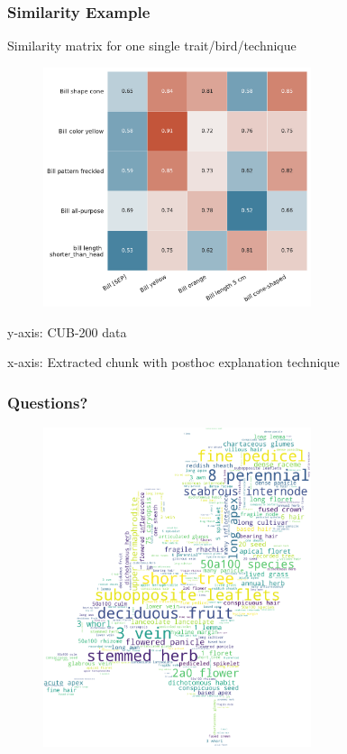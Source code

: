 \documentclass{beamer}
\begin{document}
\begin{frame}
\frametitle{Similarity Example}
Similarity matrix for one single trait/bird/technique

\begin{figure} [htbp]
    \centering
    \includegraphics[width=0.7\textwidth]{similarity_matrix.pdf}
\end{figure}

y-axis: CUB-200 data

x-axis: Extracted chunk with posthoc explanation technique
\end{frame}

\begin{frame}
\frametitle{Questions?}

\begin{figure}
    \centering
    \includegraphics[width=0.7\textwidth]{figures/cover_words.pdf}
\end{figure}

\end{frame}
\end{document}
